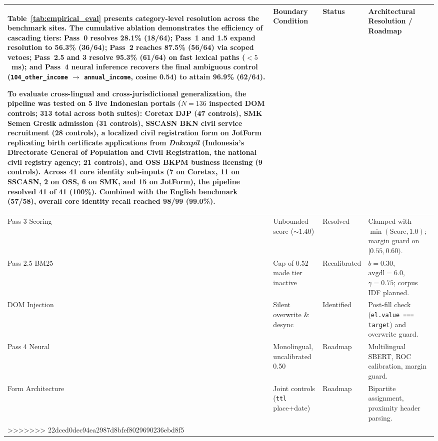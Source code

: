 \documentclass[runningheads,a4paper]{llncs}
\newcommand{\lncstablecaption}[1]{%
  \refstepcounter{table}%
  \vspace{1pt}%
  \noindent{\small\normalfont\textbf{Table \thetable.} #1}\par\vspace{2pt}}
\begin{document}
\begin{table}[t]
\begin{tabular}{p{2.0cm}p{2.8cm}p{1.4cm}p{5.1cm}}
Table~\ref{tab:empirical_eval} presents category-level resolution across the benchmark sites. The cumulative ablation demonstrates the efficiency of cascading tiers: Pass~0 resolves 28.1\% (18/64); Pass~1 and 1.5 expand resolution to 56.3\% (36/64); Pass~2 reaches 87.5\% (56/64) via scoped vetoes; Pass~2.5 and 3 resolve 95.3\% (61/64) on fast lexical paths ($<5$~ms); and Pass~4 neural inference recovers the final ambiguous control (\texttt{104\_other\_income} $\rightarrow$ \texttt{annual\_income}, cosine 0.54) to attain 96.9\% (62/64).

To evaluate cross-lingual and cross-jurisdictional generalization, the pipeline was tested on 5 live Indonesian portals ($N = 136$ inspected DOM controls; 313 total across both suites): Coretax DJP (47 controls), SMK Semen Gresik admission (31 controls), SSCASN BKN civil service recruitment (28 controls), a localized civil registration form on JotForm replicating birth certificate applications from \emph{Dukcapil} (Indonesia's Directorate General of Population and Civil Registration, the national civil registry agency; 21 controls), and OSS BKPM business licensing (9 controls). Across 41 core identity sub-inputs (7 on Coretax, 11 on SSCASN, 2 on OSS, 6 on SMK, and 15 on JotForm), the pipeline resolved 41 of 41 (100\%). Combined with the English benchmark (57/58), overall core identity recall reached 98/99 (99.0\%).

\begin{table}[!t]
\lncstablecaption{Boundary conditions and readiness status of the reference implementation.}
\label{tab:audit}
\scriptsize\normalfont
\setlength{\tabcolsep}{3.5pt}
\renewcommand{\arraystretch}{0.95}
\begin{tabularx}{\textwidth}{L{1.8cm}L{2.5cm}L{2.0cm}Y}
\toprule
\textbf{Component} & \textbf{Boundary Condition} & \textbf{Status} & \textbf{Architectural Resolution / Roadmap} \\
\midrule
Pass 3 Scoring & Unbounded score ($\sim 1.40$) & Resolved & Clamped with $\min(\text{Score}, 1.0)$; margin guard on $[0.55, 0.60)$. \\
Pass 2.5 BM25 & Cap of 0.52 made tier inactive & Recalibrated & $b = 0.30$, $\text{avgdl} = 6.0$, $\gamma = 0.75$; corpus IDF planned. \\
DOM Injection & Silent overwrite \& desync & Identified & Post-fill check (\texttt{el.value === target}) and overwrite guard. \\
Pass 4 Neural & Monolingual, uncalibrated 0.50 & Roadmap & Multilingual SBERT, ROC calibration, margin guard. \\
Form Architecture & Joint controls (\texttt{ttl} place+date) & Roadmap & Bipartite assignment, proximity header parsing. \\
>>>>>>> 22dced0dec94ea2987d8bfef8029690236ebd8f5
\bottomrule
\end{tabular}
\end{table}
\end{document}

